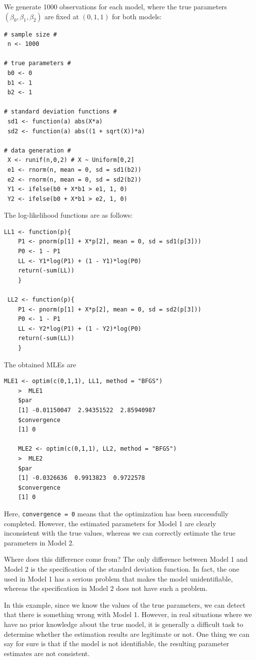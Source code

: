 \documentclass[10.5pt, A4paper, openany, uplatex]{book}
\numberwithin{equation}{section}
\begin{document}
We generate 1000 observations for each model, where the true parameters $(\beta_0,\beta_1,\beta_2)$ are fixed at $(0,1,1)$ for both models:
\begin{lstlisting}[basicstyle=\ttfamily\footnotesize, frame=single]
# sample size #
 n <- 1000

# true parameters #
 b0 <- 0
 b1 <- 1
 b2 <- 1

# standard deviation functions #
 sd1 <- function(a) abs(X*a)
 sd2 <- function(a) abs((1 + sqrt(X))*a)

# data generation #
 X <- runif(n,0,2) # X ~ Uniform[0,2]
 e1 <- rnorm(n, mean = 0, sd = sd1(b2))
 e2 <- rnorm(n, mean = 0, sd = sd2(b2))
 Y1 <- ifelse(b0 + X*b1 > e1, 1, 0)
 Y2 <- ifelse(b0 + X*b1 > e2, 1, 0)
\end{lstlisting}
The log-likelihood functions are as follows:
\begin{lstlisting}[basicstyle=\ttfamily\footnotesize, frame=single]
 LL1 <- function(p){
	P1 <- pnorm(p[1] + X*p[2], mean = 0, sd = sd1(p[3]))
	P0 <- 1 - P1
	LL <- Y1*log(P1) + (1 - Y1)*log(P0)
	return(-sum(LL))
	}

 LL2 <- function(p){
	P1 <- pnorm(p[1] + X*p[2], mean = 0, sd = sd2(p[3]))
	P0 <- 1 - P1
	LL <- Y2*log(P1) + (1 - Y2)*log(P0)
	return(-sum(LL))
	}
\end{lstlisting}
The obtained MLEs are
\begin{lstlisting}[basicstyle=\ttfamily\footnotesize, frame=single]
	MLE1 <- optim(c(0,1,1), LL1, method = "BFGS")
	>  MLE1
	$par
	[1] -0.01150047  2.94351522  2.85940987
	$convergence
	[1] 0 

	MLE2 <- optim(c(0,1,1), LL2, method = "BFGS")
	>  MLE2
	$par
	[1] -0.0326636  0.9913823  0.9722578
	$convergence
	[1] 0
\end{lstlisting}
Here, \texttt{convergence = 0} means that the optimization has been successfully completed.
However, the estimated parameters for Model 1 are clearly inconsistent with the true values, whereas we can correctly estimate the true parameters in Model 2.

Where does this difference come from?
The only difference between Model 1 and Model 2 is the specification of the standrd deviation function.
In fact, the one used in Model 1 has a serious problem that makes the model unidentifiable, whereas the specification in Model 2 does not have such a problem.

In this example, since we know the values of the true parameters, we can detect that there is something wrong with Model 1.
However, in real situations where we have no prior knowledge about the true model, it is generally a difficult task to determine whether the estimation results are legitimate or not.
One thing we can say for sure is that if the model is not identifiable, the resulting parameter estimates are not consistent.
\end{document}
